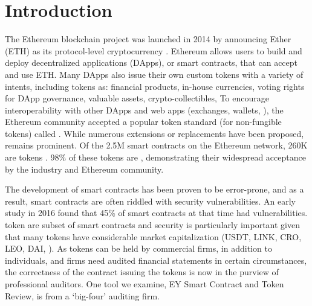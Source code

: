 
\section{Introduction}
\label{sect:introduction}

The Ethereum blockchain project was launched in 2014 by announcing Ether (ETH) as its protocol-level cryptocurrency \cite{EthGit,EIP150}. Ethereum allows users to build and deploy decentralized applications (DApps), or smart contracts, that can accept and use ETH. Many DApps also issue their own custom tokens with a variety of intents, including tokens as: financial products, in-house currencies, voting rights for DApp governance, valuable assets, crypto-collectibles, \etc To encourage interoperability with other DApps and web apps (exchanges, wallets, \etc), the Ethereum community accepted a popular token standard (for non-fungible tokens) called \erc\cite{ERC20Std}. While numerous \erc extensions or replacements have been proposed, \erc remains prominent. Of the 2.5M\cite{Alethio} smart contracts on the Ethereum network, 260K are tokens \cite{TokenTracker}. 98\% of these tokens are \erc\cite{EtherScan}, demonstrating their widespread acceptance by the industry and Ethereum community.

The development of smart contracts has been proven to be error-prone, and as a result, smart contracts are often riddled with security vulnerabilities. An early study in 2016 found that 45\% of smart contracts at that time had vulnerabilities\cite{MakSm}. \erc token are subset of smart contracts and security is particularly important given that many tokens have considerable market capitalization (\eg USDT, LINK, CRO, LEO, DAI, \etc). As tokens can be held by commercial firms, in addition to individuals, and firms need audited financial statements in certain circumstances, the correctness of the contract issuing the tokens is now in the purview of professional auditors. One tool we examine, EY Smart Contract and Token Review\cite{EYTool}, is from a `big-four' auditing firm. 


